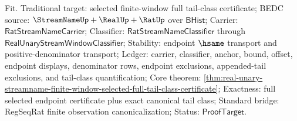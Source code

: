 Fit. Traditional target: selected finite-window full tail-class certificate;
BEDC source: $\StreamNameUp+\RealUp+\RatUp$ over $\mathsf{BHist}$; Carrier:
$\mathsf{RatStreamNameCarrier}$; Classifier: $\mathsf{RatStreamNameClassifier}$
through $\mathsf{RealUnaryStreamWindowClassifier}$; Stability: endpoint $\hsame$
transport and positive-denominator transport; Ledger: carrier, classifier,
anchor, bound, offset, endpoint displays, denominator rows, endpoint exclusions,
appended-tail exclusions, and tail-class quantification; Core theorem:
\autoref{thm:real-unary-streamname-finite-window-selected-full-tail-class-certificate};
Exactness: full selected endpoint certificate plus exact canonical tail class;
Standard bridge: RegSeqRat finite observation canonicalization; Status:
$\mathsf{ProofTarget}$.
